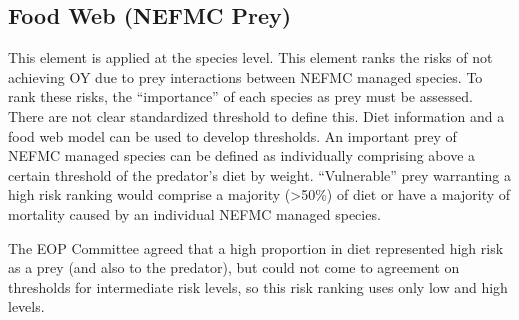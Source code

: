 \documentclass[11pt,]{article}
\begin{document}
\subsection{Food Web (NEFMC Prey)}\label{food-web-nefmc-prey}

This element is applied at the species level. This element ranks the
risks of not achieving OY due to prey interactions between NEFMC managed
species. To rank these risks, the ``importance'' of each species as prey
must be assessed. There are not clear standardized threshold to define
this. Diet information and a food web model can be used to develop
thresholds. An important prey of NEFMC managed species can be defined as
individually comprising above a certain threshold of the predator's diet
by weight. ``Vulnerable'' prey warranting a high risk ranking would
comprise a majority (\textgreater{}50\%) of diet or have a majority of
mortality caused by an individual NEFMC managed species.

The EOP Committee agreed that a high proportion in diet represented high
risk as a prey (and also to the predator), but could not come to
agreement on thresholds for intermediate risk levels, so this risk
ranking uses only low and high levels.
\end{document}
